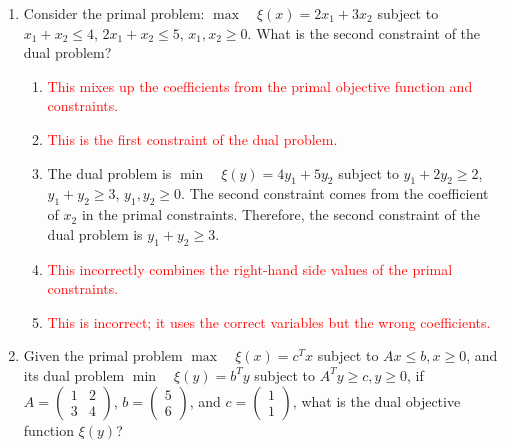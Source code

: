 \documentclass{article}%
\newcommand{\incorrect}[1]{\textcolor{red}{#1}}
\begin{document}
\begin{enumerate}
\begin{enumerate}
\item \incorrect{This would be the result if $b = \begin{pmatrix} 0 \\ 0 \end{pmatrix}$ and $y = \begin{pmatrix} 1 \\ 1 \end{pmatrix}$}%
\item \incorrect{This would be the result if $b = \begin{pmatrix} 2 \\ 2 \end{pmatrix}$ and $y = \begin{pmatrix} 1 \\ 1 \end{pmatrix}$}%
\end{enumerate}%
\vspace{1em}%
\item Consider the primal problem: $\max \quad \xi(x) = 2x_1 + 3x_2$ subject to $x_1 + x_2 \le 4$, $2x_1 + x_2 \le 5$, $x_1, x_2 \ge 0$. What is the second constraint of the dual problem?%
\begin{enumerate}%
\item \incorrect{This mixes up the coefficients from the primal objective function and constraints.}%
\item \incorrect{This is the first constraint of the dual problem.}%
\item The dual problem is $\min \quad \xi(y) = 4y_1 + 5y_2$ subject to $y_1 + 2y_2 \ge 2$, $y_1 + y_2 \ge 3$, $y_1, y_2 \ge 0$. The second constraint comes from the coefficient of $x_2$ in the primal constraints.  Therefore, the second constraint of the dual problem is $y_1 + y_2 \ge 3$.%
\item \incorrect{This incorrectly combines the right-hand side values of the primal constraints.}%
\item \incorrect{This is incorrect; it uses the correct variables but the wrong coefficients.}%
\end{enumerate}%
\vspace{1em}%
\item Given the primal problem $\max \quad \xi(x) = c^T x$ subject to $Ax \le b, x \ge 0$, and its dual problem $\min \quad \xi(y) = b^T y$ subject to $A^T y \ge c, y \ge 0$, if $A = \begin{pmatrix} 1 & 2 \\ 3 & 4 \end{pmatrix}$, $b = \begin{pmatrix} 5 \\ 6 \end{pmatrix}$, and $c = \begin{pmatrix} 1 \\ 1 \end{pmatrix}$, what is the dual objective function $\xi(y)$?%

\end{enumerate}
\end{document}

